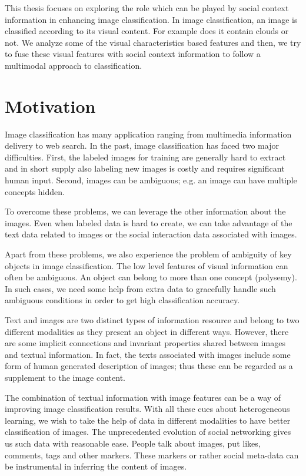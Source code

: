 This thesis focuses on exploring the role which can be played 
by social context information in enhancing image classification. 
In image classification, an image is classified according to its 
visual content. For example does it contain clouds or not. We 
analyze some of the visual characteristics based features and then, 
we try to fuse these visual features with social context 
information to follow a multimodal approach to classification. 
\section{Motivation}
Image classification has many application ranging from multimedia 
information delivery to web search. In the past, image 
classification has faced two major difficulties. First, the labeled 
images for training are generally hard to extract and in short  
supply also labeling new images is costly and requires significant
human input. Second, images can be ambiguous; e.g. an image can have 
multiple concepts hidden. 

To overcome these problems, we can leverage the other information 
about the images. Even when labeled data is hard to create, we can 
take advantage of the text data related to images or the social 
interaction data associated with images.

Apart from these problems, we also experience the problem of 
ambiguity of key objects in image classification. The low level 
features of visual information can often be ambiguous. An object can 
belong to more than one concept (polysemy). In such cases, we need 
some help from extra data to gracefully handle such ambiguous 
conditions in order to get high classification accuracy.

Text and images are two distinct types of information resource and 
belong to two different modalities as they present an object in 
different ways. However, there are some implicit connections and 
invariant properties shared between images and textual information. 
In fact, the texts associated with images include some form of human 
generated description of images; thus these can be regarded as a 
supplement to the image content.

The combination of textual information with image features can be a 
way of improving image classification results. With all these cues 
about heterogeneous learning, we wish to take the help of data in 
different modalities to have better classification of images. The 
unprecedented evolution of social networking gives us such data with 
reasonable ease. People talk about images, put likes, comments, 
tags and other markers. These markers or rather social meta-data can 
be instrumental in inferring the content of images.

